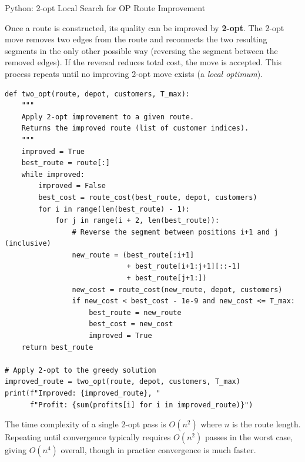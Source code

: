 \documentclass[aspectratio=169,10pt]{beamer}
\begin{document}
\begin{frame}[fragile]{Python: 2-opt Local Search for OP Route Improvement}

  Once a route is constructed, its quality can be improved by \textbf{2-opt}.
  The 2-opt move removes two edges from the route and reconnects the two
  resulting segments in the only other possible way (reversing the segment
  between the removed edges).
  If the reversal reduces total cost, the move is accepted.
  This process repeats until no improving 2-opt move exists (a \emph{local
  optimum}).

\begin{lstlisting}
def two_opt(route, depot, customers, T_max):
    """
    Apply 2-opt improvement to a given route.
    Returns the improved route (list of customer indices).
    """
    improved = True
    best_route = route[:]
    while improved:
        improved = False
        best_cost = route_cost(best_route, depot, customers)
        for i in range(len(best_route) - 1):
            for j in range(i + 2, len(best_route)):
                # Reverse the segment between positions i+1 and j (inclusive)
                new_route = (best_route[:i+1]
                             + best_route[i+1:j+1][::-1]
                             + best_route[j+1:])
                new_cost = route_cost(new_route, depot, customers)
                if new_cost < best_cost - 1e-9 and new_cost <= T_max:
                    best_route = new_route
                    best_cost = new_cost
                    improved = True
    return best_route

# Apply 2-opt to the greedy solution
improved_route = two_opt(route, depot, customers, T_max)
print(f"Improved: {improved_route}, "
      f"Profit: {sum(profits[i] for i in improved_route)}")
\end{lstlisting}

  \medskip
  The time complexity of a single 2-opt pass is $O(n^2)$ where $n$ is the
  route length.
  Repeating until convergence typically requires $O(n^2)$ passes in the
  worst case, giving $O(n^4)$ overall, though in practice convergence is
  much faster.

\end{frame}
\end{document}
